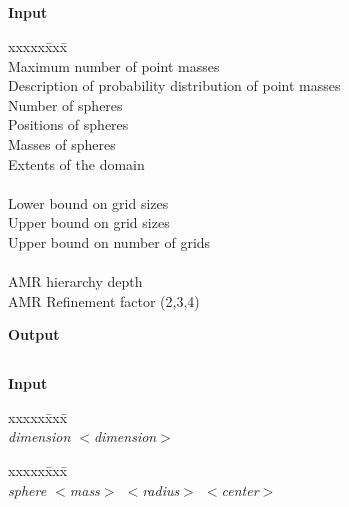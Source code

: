 \documentclass[11pt]{article}
\begin{document}
\subsection{}

\textbf{Input}

\begin{tabbing}
xxxxx\=xxx\=\kill\\ 
\> \todo \>  Maximum number of point masses \\
\> \todo \>  Description of probability distribution of point masses \\
\> \todo \>  Number of spheres \\
\> \todo \>  Positions of spheres \\
\> \todo \>  Masses of spheres \\
\> \todo \>  Extents of the domain \\
 \\
\> \todo \>  Lower bound on grid sizes \\
\> \todo \>  Upper bound on grid sizes \\
\> \todo \>  Upper bound on number of grids \\
 \\
\> \todo \>  AMR hierarchy depth \\
\> \todo \>  AMR Refinement factor (2,3,4) \\
\end{tabbing}

\textbf{Output}


\subsection{}

\textbf{Input}

\begin{tabbing}
xxxxx\=xxx\=\kill\\ 
\> \done \textit{dimension $<$dimension$>$} \\
\> \> 
\end{tabbing}

\begin{tabbing}
xxxxx\=xxx\=\kill\\ 
\> \done \textit{sphere $<$mass$>$ $<$radius$>$ $<$center$>$} \\
\>\>  \\
\>\>  \\
\>\> 
\end{tabbing}
\end{document}
